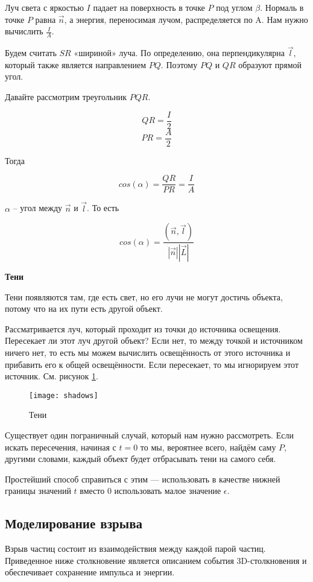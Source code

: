 Луч света с яркостью $I$ падает на поверхность в точке $P$ под углом  $\beta$. Нормаль в точке $P$ равна $\vec n$, а энергия, переносимая лучом, распределяется по A. Нам нужно вычислить $\frac{I}{A}$.

Будем считать $SR$ «шириной» луча. По определению, она перпендикулярна $\vec l$, который также является направлением $PQ$. Поэтому $PQ$ и $QR$ образуют прямой угол. 

Давайте рассмотрим треугольник $PQR$. 

$$QR = \frac{I}{2}$$
$$PR = \frac{A}{2}$$

Тогда

$$cos(\alpha) = \frac{QR}{PR} = \frac{I}{A}$$
 
$\alpha$ -- угол между $\vec n$ и $\vec l$. То есть

$$cos(\alpha) = \frac{(\vec n, \vec l)}{|\vec n||\vec L|}$$

\textbf{Тени}

Тени появляются там, где есть свет, но его лучи не могут достичь объекта, потому что на их пути есть другой объект.

Рассматривается луч, который проходит из точки до источника освещения. Пересекает ли этот луч другой объект? Если нет, то между точкой и источником ничего нет, то есть мы можем вычислить освещённость от этого источника и прибавить его к общей освещённости. Если пересекает, то мы игнорируем этот источник. См. рисунок \ref{img:shadows}. 

\begin{figure}[H]
	\centering
	\texttt{[image: shadows]}
	\caption{Тени}
	\label{img:shadows}
\end{figure}

Существует один пограничный случай, который нам нужно рассмотреть. Если искать пересечения, начиная с $t=0$ то мы, вероятнее всего, найдём саму $P$, другими словами, каждый объект будет отбрасывать тени на самого себя. 

Простейший способ справиться с этим — использовать в качестве нижней границы значений $t$ вместо 0 использовать малое значение $\epsilon$. 

\subsection{\textbf{Моделирование взрыва}}

\hfill

Взрыв частиц состоит из взаимодействия между каждой парой частиц. Приведенное ниже столкновение является описанием события 3D-столкновения и обеспечивает сохранение импульса и энергии.

